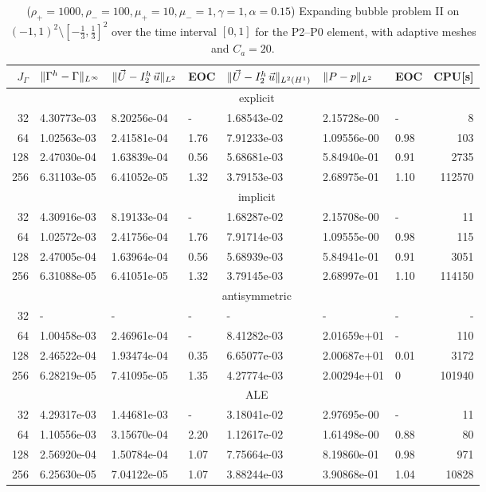 \begin{table}
\center
\hspace*{-3.25cm}
\begin{tabular}{rllllllr}
\hline
$J_\Gamma$ & $\|\Gamma^h - \Gamma\|_{L^\infty}$ & $\|\vec U - I^h_{2}\,\vec u\|_{L^2}$ & EOC & $\|\vec U - I^h_{2}\,\vec u\|_{L^2(H^1)}$ & $\|P - p\|_{L^2}$ & EOC
& CPU[s] \\
\hline
& \multicolumn{7}{c}{explicit} \\
\hline
 32 & 4.30773e-03 & 8.20256e-04 &    - & 1.68543e-02 & 2.15728e-00 &    - &
8 \\
 64 & 1.02563e-03 & 2.41581e-04 & 1.76 & 7.91233e-03 & 1.09556e-00 & 0.98 &
103 \\
128 & 2.47030e-04 & 1.63839e-04 & 0.56 & 5.68681e-03 & 5.84940e-01 & 0.91 &
2735 \\
256 & 6.31103e-05 & 6.41052e-05 & 1.32 & 3.79153e-03 & 2.68975e-01 & 1.10 &
112570 \\
\hline
& \multicolumn{7}{c}{implicit} \\
\hline
 32 & 4.30916e-03 & 8.19133e-04 &    - & 1.68287e-02 & 2.15708e-00 &    - &
11 \\
 64 & 1.02572e-03 & 2.41756e-04 & 1.76 & 7.91714e-03 & 1.09555e-00 & 0.98 &
115 \\
128 & 2.47005e-04 & 1.63964e-04 & 0.56 & 5.68939e-03 & 5.84941e-01 & 0.91 &
3051 \\
256 & 6.31088e-05 & 6.41051e-05 & 1.32 & 3.79145e-03 & 2.68997e-01 & 1.10 &
114150 \\
\hline
& \multicolumn{7}{c}{antisymmetric} \\
\hline
 32 &           - &           - &    - &           - &           - &    - &
- \\
 64 & 1.00458e-03 & 2.46961e-04 &    - & 8.41282e-03 & 2.01659e+01 &    - &
110 \\
128 & 2.46522e-04 & 1.93474e-04 & 0.35 & 6.65077e-03 & 2.00687e+01 & 0.01 &
3172 \\
256 & 6.28219e-05 & 7.41095e-05 & 1.35 & 4.27774e-03 & 2.00294e+01 &    0 &
101940 \\
\hline
& \multicolumn{7}{c}{ALE} \\
\hline
 32 & 4.29317e-03 & 1.44681e-03 &    - & 3.18041e-02 & 2.97695e-00 &    - &
11 \\
 64 & 1.10556e-03 & 3.15670e-04 & 2.20 & 1.12617e-02 & 1.61498e-00 & 0.88 &
80 \\
128 & 2.56920e-04 & 1.50784e-04 & 1.07 & 7.75664e-03 & 8.19860e-01 & 0.98 &
971 \\
256 & 6.25630e-05 & 7.04122e-05 & 1.07 & 3.88244e-03 & 3.90868e-01 & 1.04 &
10828 \\
\hline
\end{tabular}
\hspace*{-3.25cm}
\caption[Navier--Stokes expanding bubble II errors P2--P0]
{($\rho_+ = 1000,\rho_- = 100,\mu_+ = 10,\mu_- =1,\gamma = 1,\alpha=0.15$)
Expanding bubble problem II on $(-1,1)^2\setminus[-\frac{1}{3},\frac{1}{3}]^2$
over the time interval $[0,1]$ for the P2--P0 element, with adaptive
meshes and $C_a=20$\textdegree.}
\label{tab:nsexpandingbubbleIIp2p0}
\end{table}
